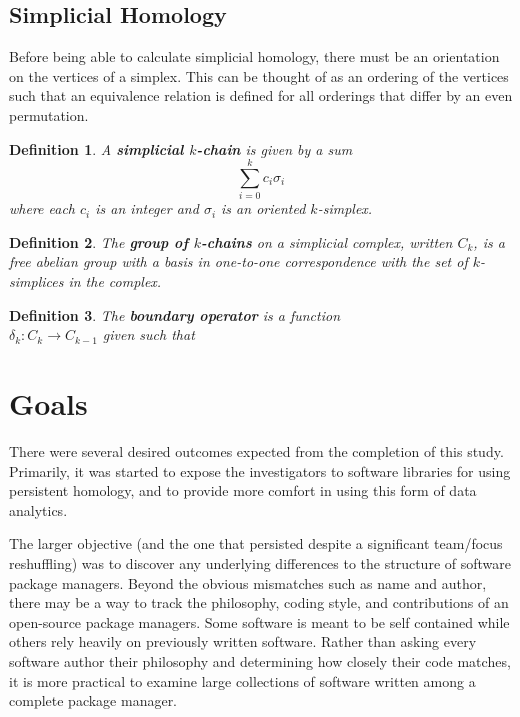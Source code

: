 \documentclass[letterpaper, 10 pt, conference]{ieeeconf}  %
\newtheorem{defn}{Definition}
\begin{document}
\subsection{Simplicial Homology}
\label{subsec.simhomo}

Before being able to calculate simplicial homology, there must be an orientation on the vertices of a simplex. This can be thought of as an ordering of the vertices such that an equivalence relation is defined for all orderings that differ by an even permutation.

\begin{defn}
A {\bf simplicial $k$-chain} is given by a sum $$\sum\limits_{i=0}^k c_i\sigma_i$$ where each $c_i$ is an integer and $\sigma_i$ is an oriented $k$-simplex.
\end{defn}
\begin{defn}
	The {\bf group of $k$-chains} on a simplicial complex, written $C_k$, is a free abelian group with a basis in one-to-one correspondence with the set of $k$-simplices in the complex.
\end{defn}
\begin{defn}
	The {\bf boundary operator} is a function\\
	$\delta_k:C_k \rightarrow C_{k-1}$ given such that 
\end{defn}

\section{Goals}
\label{sec.goals}

There were several desired outcomes expected from the completion of this study. Primarily, it was started to expose the investigators to software libraries for using persistent homology, and to provide more comfort in using this form of data analytics.

The larger objective (and the one that persisted despite a significant team/focus reshuffling) was to discover any underlying differences to the structure of software package managers. Beyond the obvious mismatches such as name and author, there may be a way to track the philosophy, coding style, and contributions of an open-source package managers. Some software is meant to be self contained while others rely heavily on previously written software. Rather than asking every software author their philosophy and determining how closely their code matches, it is more practical to examine large collections of software written among a complete package manager.
\end{document}
